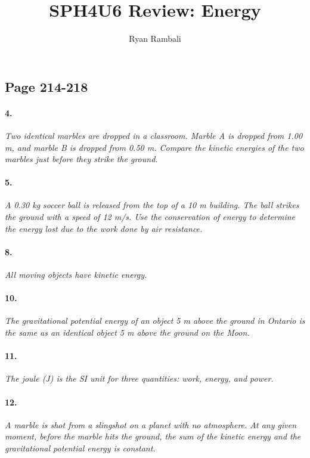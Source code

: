 \documentclass[]{article}
\title{SPH4U6 Review: Energy}
\author{Ryan Rambali}
\begin{document}
\subsection*{Page 214-218}
\paragraph{4.}
	\textit{
		Two identical marbles are dropped in a classroom.
		Marble A is dropped from 1.00 m, and marble B is
		dropped from 0.50 m. Compare the kinetic energies
		of the two marbles just before they strike the ground.
	}\\	
\par
\paragraph{5.}
\textit{
 		A 0.30 kg soccer ball is released from the top of a
		10 m building. The ball strikes the ground with a
		speed of 12 m/s. Use the conservation of energy to
		determine the energy lost due to the work done by
		air resistance.
}\\	
\paragraph{8.}
\textit{
		All moving objects have kinetic energy.
}\\	
\par
\paragraph{10.}
\textit{
	The gravitational potential energy of an object 5 m
	above the ground in Ontario is the same as an identical
	object 5 m above the ground on the Moon.
}\\	
\par
\paragraph{11.}
\textit{
	The joule (J) is the SI unit for three quantities: work,
	energy, and power.
}\\	
\par
\paragraph{12.}
\textit{
	A marble is shot from a slingshot on a planet with no
	atmosphere. At any given moment, before the marble
	hits the ground, the sum of the kinetic energy and the
	gravitational potential energy is constant.
}\\	
\par
\end{document}
